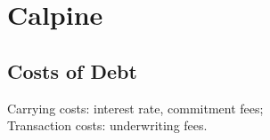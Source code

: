 \section{Calpine}
	\subsection*{Costs of Debt}
	Carrying costs: interest rate, commitment fees;\\
	Transaction costs: underwriting fees.
